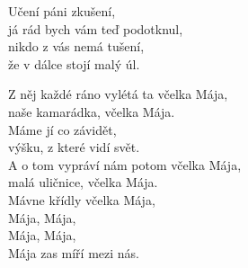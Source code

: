  
\vspace{10mm}

\nv{}Učení páni zkušení, \nc{}\\
já rád bych vám teď podotknul,\\
nikdo z vás nemá tušení, \nc{}\\
že v dálce stojí malý úl.\\
\vnv

\nv{}Z něj každé ráno vylétá ta včelka Mája,\\
naše kamarádka, včelka Mája.\\
Máme jí co závidět,\\
výšku, z které vidí svět.\\
A o tom vypráví nám potom včelka Mája,\\
malá uličnice, včelka Mája. \\
Mávne křídly včelka Mája, \\
Mája, Mája,\\
Mája, Mája,\\
Mája zas míří mezi nás.

\newpage
